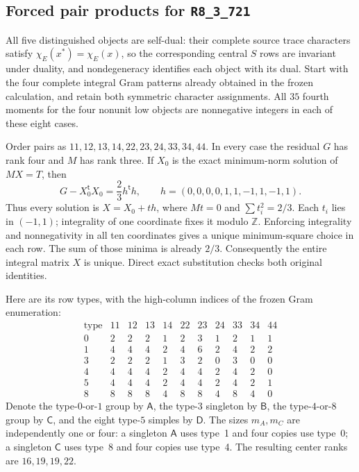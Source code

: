 \subsection{Forced pair products for \texttt{R8\_3\_721}}

All five distinguished objects are self-dual: their complete source
trace characters satisfy $\chi_E(x^*)=\chi_E(x)$, so the corresponding
central $S$ rows are invariant under duality, and nondegeneracy identifies
each object with its dual.  Start with the four complete integral Gram
patterns already obtained in the frozen calculation, and retain both
symmetric character assignments.  All $35$ fourth moments for the four
nonunit low objects are nonnegative integers in each of these eight cases.

Order pairs as $11,12,13,14,22,23,24,33,34,44$.  In every case
the residual $G$ has rank four and $M$ has rank three.  If $X_0$ is the
exact minimum-norm solution of $MX=T$, then
\[
 G-X_0^{\mathsf t}X_0=\frac23h^{\mathsf t}h,
 \qquad h=(0,0,0,0,1,1,-1,1,-1,1).
\]
Thus every solution is $X=X_0+t h$, where $Mt=0$ and
$\sum t_i^2=2/3$.  Each $t_i$ lies in $(-1,1)$; integrality of one
coordinate fixes it modulo $\mathbb Z$.  Enforcing integrality and
nonnegativity in all ten coordinates gives a unique minimum-square
choice in each row.  The sum of those minima is already $2/3$.
Consequently the entire integral matrix $X$ is unique.  Direct exact
substitution checks both original identities.

Here are its row types, with the high-column indices of the frozen
Gram enumeration:
\[
\begin{array}{c|rrrrrrrrrr}
\text{type}&11&12&13&14&22&23&24&33&34&44\\\hline
0&2&2&2&1&2&3&1&2&1&1\\
1&4&4&4&2&4&6&2&4&2&2\\
3&2&2&2&1&3&2&0&3&0&0\\
4&4&4&4&2&4&4&2&4&2&0\\
5&4&4&4&2&4&4&2&4&2&1\\
8&8&8&8&4&8&8&4&8&4&0
\end{array}
\]
Denote the type-$0$-or-$1$ group by $\mathsf A$, the type-$3$
singleton by $\mathsf B$, the type-$4$-or-$8$ group by $\mathsf C$,
and the eight type-$5$ simples by $\mathsf D$.  The sizes
$m_A,m_C$ are independently one or four: a singleton $\mathsf A$
uses type~1 and four copies use type~0; a singleton $\mathsf C$ uses
type~8 and four copies use type~4.  The resulting center ranks are
$16,19,19,22$.

